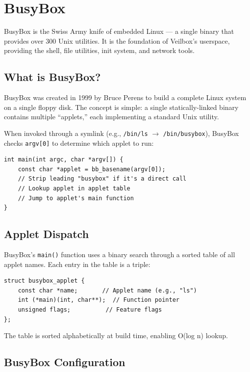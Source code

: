 \chapter{BusyBox}
\label{ch:busybox}

BusyBox is the Swiss Army knife of embedded Linux — a single binary that
provides over 300 Unix utilities. It is the foundation of Veilbox's
userspace, providing the shell, file utilities, init system, and network
tools.

\section{What is BusyBox?}

BusyBox was created in 1999 by Bruce Perens to build a complete Linux
system on a single floppy disk. The concept is simple: a single
statically-linked binary contains multiple ``applets,'' each implementing
a standard Unix utility.

When invoked through a symlink (e.g., \texttt{/bin/ls} $\rightarrow$
\texttt{/bin/busybox}), BusyBox checks \texttt{argv[0]} to determine
which applet to run:

\begin{lstlisting}
int main(int argc, char *argv[]) {
    const char *applet = bb_basename(argv[0]);
    // Strip leading "busybox" if it's a direct call
    // Lookup applet in applet table
    // Jump to applet's main function
}
\end{lstlisting}

\section{Applet Dispatch}

BusyBox's \texttt{main()} function uses a binary search through a sorted
table of all applet names. Each entry in the table is a triple:

\begin{lstlisting}
struct busybox_applet {
    const char *name;       // Applet name (e.g., "ls")
    int (*main)(int, char**);  // Function pointer
    unsigned flags;          // Feature flags
};
\end{lstlisting}

The table is sorted alphabetically at build time, enabling O(log n) lookup.

\section{BusyBox Configuration}

